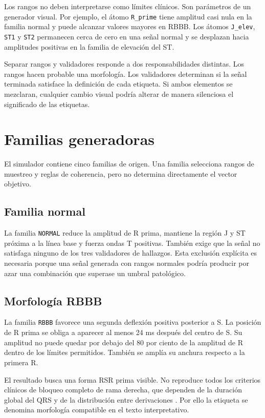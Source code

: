 Los rangos no deben interpretarse como límites clínicos. Son parámetros de un generador visual. Por ejemplo, el átomo \texttt{R\_prime} tiene amplitud casi nula en la familia normal y puede alcanzar valores mayores en RBBB. Los átomos \texttt{J\_elev}, \texttt{ST1} y \texttt{ST2} permanecen cerca de cero en una señal normal y se desplazan hacia amplitudes positivas en la familia de elevación del ST.

Separar rangos y validadores responde a dos responsabilidades distintas. Los rangos hacen probable una morfología. Los validadores determinan si la señal terminada satisface la definición de cada etiqueta. Si ambos elementos se mezclaran, cualquier cambio visual podría alterar de manera silenciosa el significado de las etiquetas.

\section{Familias generadoras}

El simulador contiene cinco familias de origen. Una familia selecciona rangos de muestreo y reglas de coherencia, pero no determina directamente el vector objetivo.

\subsection{Familia normal}

La familia \texttt{NORMAL} reduce la amplitud de R prima, mantiene la región J y ST próxima a la línea base y fuerza ondas T positivas. También exige que la señal no satisfaga ninguno de los tres validadores de hallazgos. Esta exclusión explícita es necesaria porque una señal generada con rangos normales podría producir por azar una combinación que superase un umbral patológico.

\subsection{Morfología RBBB}

La familia \texttt{RBBB} favorece una segunda deflexión positiva posterior a S. La posición de R prima se obliga a aparecer al menos 24 ms después del centro de S. Su amplitud no puede quedar por debajo del 80 por ciento de la amplitud de R dentro de los límites permitidos. También se amplía su anchura respecto a la primera R.

El resultado busca una forma RSR prima visible. No reproduce todos los criterios clínicos de bloqueo completo de rama derecha, que dependen de la duración global del QRS y de la distribución entre derivaciones \cite{surawicz2009}. Por ello la etiqueta se denomina morfología compatible en el texto interpretativo.

